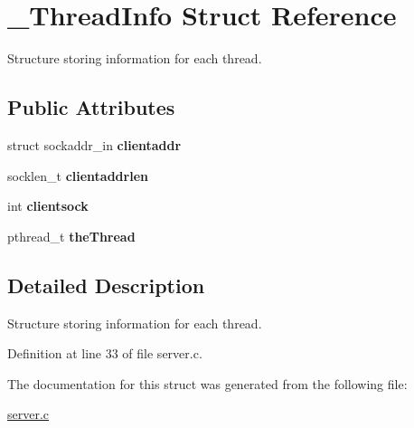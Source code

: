 \hypertarget{struct__ThreadInfo}{\section{\-\_\-\-Thread\-Info Struct Reference}
\label{struct__ThreadInfo}
}


Structure storing information for each thread.  


\subsection*{Public Attributes}
\begin{DoxyCompactItemize}
\item 
\hypertarget{struct__ThreadInfo_aa9f208126429edde9b92b36368d1a4eb}{struct sockaddr\-\_\-in {\bfseries clientaddr}}\label{struct__ThreadInfo_aa9f208126429edde9b92b36368d1a4eb}

\item 
\hypertarget{struct__ThreadInfo_a39998c53a4a60571b9dc8fbe0dbdaf4e}{socklen\-\_\-t {\bfseries clientaddrlen}}\label{struct__ThreadInfo_a39998c53a4a60571b9dc8fbe0dbdaf4e}

\item 
\hypertarget{struct__ThreadInfo_a1432940ba571be27591c7f8c40748232}{int {\bfseries clientsock}}\label{struct__ThreadInfo_a1432940ba571be27591c7f8c40748232}

\item 
\hypertarget{struct__ThreadInfo_a8907ec2a16e85c7d0b5a431d26c5a525}{pthread\-\_\-t {\bfseries the\-Thread}}\label{struct__ThreadInfo_a8907ec2a16e85c7d0b5a431d26c5a525}

\end{DoxyCompactItemize}


\subsection{Detailed Description}
Structure storing information for each thread. 

Definition at line 33 of file server.\-c.



The documentation for this struct was generated from the following file\-:\begin{DoxyCompactItemize}
\item 
\hyperlink{server_8c}{server.\-c}\end{DoxyCompactItemize}
